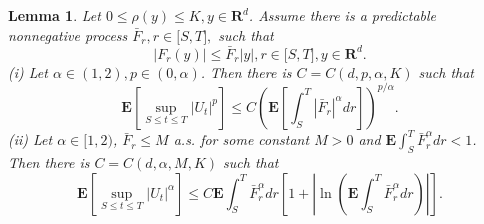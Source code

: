 \documentclass[11pt]{amsart}
\theoremstyle{plain}
\newtheorem{lemma}{Lemma}
\numberwithin{equation}{section}
\begin{document}
\begin{lemma}
\label{ele11}Let $0\leq \rho \left( y\right) \leq K,y\in \mathbf{R}^{d}$.
Assume there is a predictable nonnegative process $\bar{F}_{r},r\in \lbrack
S,T],$ such that\begin{equation*}
\left\vert F_{r}\left( y\right) \right\vert \leq \bar{F}_{r}\left\vert
y\right\vert ,r\in \lbrack S,T],y\in \mathbf{R}^{d}.
\end{equation*}
(i) Let $\alpha \in (1,2),p\in (0,\alpha )$. Then there is $C=C\left(
d,p,\alpha ,K\right) $ such that\begin{equation*}
\mathbf{E}\left[ \sup_{S\leq t\leq T}\left\vert U_{t}\right\vert ^{p}\right]
\leq C\left( \mathbf{E}\left[ \int_{S}^{T}\left\vert \bar{F}_{r}\right\vert
^{\alpha }dr\right] \right) ^{p/\alpha }.
\end{equation*}
(ii) Let $\alpha \in \lbrack 1,2)$, $\bar{F}_{r}\leq M$ a.s. for some
constant $M>0$ and $\mathbf{E}\int_{S}^{T}\bar{F}_{r}^{\alpha }dr<1$. Then
there is $C=C\left( d,\alpha ,M,K\right) $ such that\begin{equation*}
\mathbf{E}\left[ \sup_{S\leq t\leq T}\left\vert U_{t}\right\vert ^{\alpha }\right] \leq C\mathbf{E}\int_{S}^{T}\bar{F}_{r}^{\alpha }dr\left[
1+\left\vert \ln \left( \mathbf{E}\int_{S}^{T}\bar{F}_{r}^{\alpha }dr\right)
\right\vert \right] .
\end{equation*}
\end{lemma}
\end{document}
